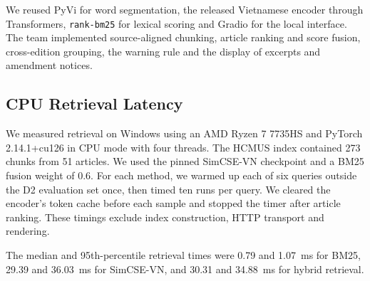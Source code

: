 We reused PyVi for word segmentation, the released Vietnamese encoder
through Transformers, \texttt{rank-bm25} for lexical scoring and Gradio
for the local interface. The team implemented source-aligned chunking,
article ranking and score fusion, cross-edition grouping, the warning
rule and the display of excerpts and amendment notices.

\subsection{CPU Retrieval Latency}
We measured retrieval on Windows using an AMD Ryzen 7 7735HS and
PyTorch 2.14.1+cu126 in CPU mode with four threads. %
The HCMUS index contained 273 chunks from 51 articles. %
We used the pinned SimCSE-VN checkpoint and a BM25 fusion weight of 0.6. %
For each method, we warmed up each of six queries outside the D2
evaluation set once, then timed ten runs per query. %
We cleared the encoder's token cache before each sample and stopped the
timer after article ranking.
These timings exclude index construction, HTTP transport and rendering.

The median and 95th-percentile retrieval times were
0.79 and 1.07~ms for BM25, %
29.39 and 36.03~ms for SimCSE-VN, %
and 30.31 and 34.88~ms for hybrid retrieval. %
